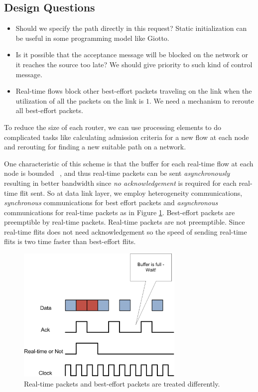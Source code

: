 \documentclass[conference, twocolumn]{IEEEtran}
\theoremstyle{definition}
\begin{document}
\subsection{Design Questions}
\begin{itemize}
\item Should we specify the path directly in this request? Static initialization 
can be useful in some programming model like Giotto.	
\item Is it possible that the acceptance message will be blocked on the network 
or it reaches the source too late? We should give priority to such kind of control
message.
\item Real-time flows block other best-effort packets traveling on the link when 
the utilization of all the packets on the link is $1$. We need a mechanism to
reroute all best-effort packets.
\end{itemize}

To reduce the size of each router, we can use processing elements to do 
complicated tasks like calculating admission criteria for a new flow at each node 
and rerouting for finding a new suitable path on a network.


One characteristic of this scheme is that the buffer for each 
real-time flow at each node is bounded ~\cite{Ferrari90ascheme}, and thus
real-time packets can be sent {\em asynchronously} resulting in better bandwidth
since {\em no acknowledgement} is required for each real-time flit sent. So at
data link layer, we employ heterogeneity communications, {\em synchronous}
communications for best effort packets and {\em asynchronous} communications
for real-time packets as in Figure \ref{fig:HeteroComm}. Best-effort packets
are preemptible by real-time packets. Real-time packets are not preemptible.
Since real-time flits does not need acknowledgement so the speed of sending
real-time flits is two time faster than best-effort flits.


\begin{figure}[htbp]
\centering
\includegraphics[width=8cm]{pics/HeteroComm.png}
\caption[Heterogeneous Communication for Packets.]
{Real-time packets and best-effort packets are treated
differently.}\label{fig:HeteroComm}
\end{figure}
\end{document}
